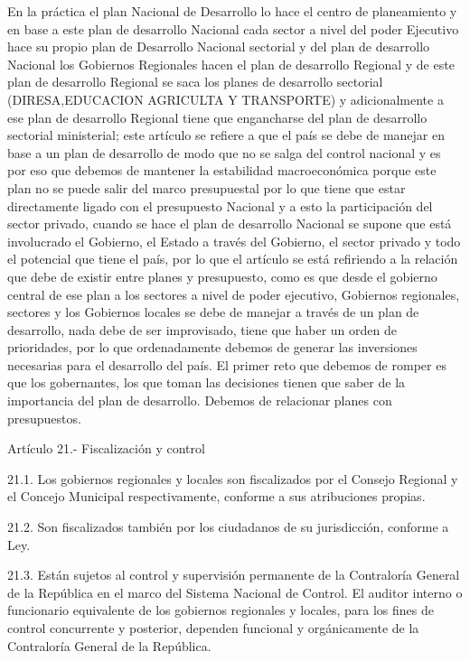 \documentclass[
  letterpaper,
  DIV=11,
  numbers=noendperiod]{scrartcl}
\begin{document}
En la práctica el plan Nacional de Desarrollo lo hace el centro de
planeamiento y en base a este plan de desarrollo Nacional cada sector a
nivel del poder Ejecutivo hace su propio plan de Desarrollo Nacional
sectorial y del plan de desarrollo Nacional los Gobiernos Regionales
hacen el plan de desarrollo Regional y de este plan de desarrollo
Regional se saca los planes de desarrollo sectorial (DIRESA,EDUCACION
AGRICULTA Y TRANSPORTE) y adicionalmente a ese plan de desarrollo
Regional tiene que engancharse del plan de desarrollo sectorial
ministerial; este artículo se refiere a que el país se debe de manejar
en base a un plan de desarrollo de modo que no se salga del control
nacional y es por eso que debemos de mantener la estabilidad
macroeconómica porque este plan no se puede salir del marco presupuestal
por lo que tiene que estar directamente ligado con el presupuesto
Nacional y a esto la participación del sector privado, cuando se hace el
plan de desarrollo Nacional se supone que está involucrado el Gobierno,
el Estado a través del Gobierno, el sector privado y todo el potencial
que tiene el país, por lo que el artículo se está refiriendo a la
relación que debe de existir entre planes y presupuesto, como es que
desde el gobierno central de ese plan a los sectores a nivel de poder
ejecutivo, Gobiernos regionales, sectores y los Gobiernos locales se
debe de manejar a través de un plan de desarrollo, nada debe de ser
improvisado, tiene que haber un orden de prioridades, por lo que
ordenadamente debemos de generar las inversiones necesarias para el
desarrollo del país. El primer reto que debemos de romper es que los
gobernantes, los que toman las decisiones tienen que saber de la
importancia del plan de desarrollo. Debemos de relacionar planes con
presupuestos.

Artículo 21.- Fiscalización y control

21.1. Los gobiernos regionales y locales son fiscalizados por el Consejo
Regional y el Concejo Municipal respectivamente, conforme a sus
atribuciones propias.

21.2. Son fiscalizados también por los ciudadanos de su jurisdicción,
conforme a Ley.

21.3. Están sujetos al control y supervisión permanente de la
Contraloría General de la República en el marco del Sistema Nacional de
Control. El auditor interno o funcionario equivalente de los gobiernos
regionales y locales, para los fines de control concurrente y posterior,
dependen funcional y orgánicamente de la Contraloría General de la
República.
\end{document}
